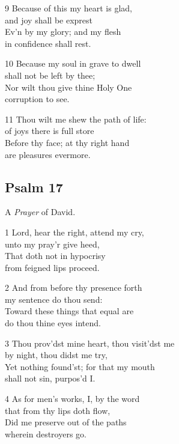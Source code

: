 \begin{multicols}{3}
9 Because of this my heart is glad,\\
and joy shall be exprest\\
Ev’n by my glory; and my flesh\\
in confidence shall rest.

10 Because my soul in grave to dwell\\
shall not be left by thee;\\
Nor wilt thou give thine Holy One\\
corruption to see.

11 Thou wilt me shew the path of life:\\
of joys there is full store\\
Before thy face; at thy right hand\\
are pleasures evermore.

\begin{center}
\quad{}\quad{}
\end{center}

\subsection*{Psalm 17 }

A \emph{Prayer} of David.

1 Lord, hear the right, attend my cry,\\
unto my pray’r give heed,\\
That doth not in hypocrisy\\
from feigned lips proceed.

2 And from before thy presence forth\\
my sentence do thou send:\\
Toward these things that equal are\\
do thou thine eyes intend.

3 Thou prov’dst mine heart, thou visit’dst me\\
by night, thou didst me try,\\
Yet nothing found’st; for that my mouth\\
shall not sin, purpos’d I.

4 As for men’s works, I, by the word\\
that from thy lips doth flow,\\
Did me preserve out of the paths\\
wherein destroyers go.


\end{multicols}
